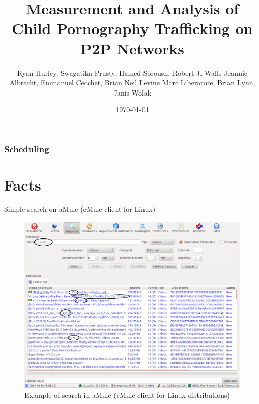 \documentclass[notes]{beamer}
\title{Measurement and Analysis of Child Pornography Trafficking on P2P Networks\nocite{Hurley}}
\subtitle{}
\institute{Instituto de Computação - Unicamp}
\date{\today}
\author{Ryan Hurley, Swagatika Prusty, Hamed Soroush, Robert J. Walls
Jeannie Albrecht, Emmanuel Cecchet, Brian Neil Levine
Marc Liberatore, Brian Lynn, Janis Wolak}
\begin{document}
\begin{frame}
  \titlepage
\end{frame}

\begin{frame}
  \frametitle{Scheduling}
  \tableofcontents
\end{frame}

\section{Facts}
\begin{frame}
\begin{block}{Simple search on aMule (eMule client for Linux)}

\begin{figure}[!htb]
\centering
\includegraphics[scale=0.2]{pedo_emule}
\caption{Example of search in aMule (eMule client for Linux distributions)}
\label{fig:pedo_emule}
\end{figure}

\end{block}

\end{frame}
\end{document}
